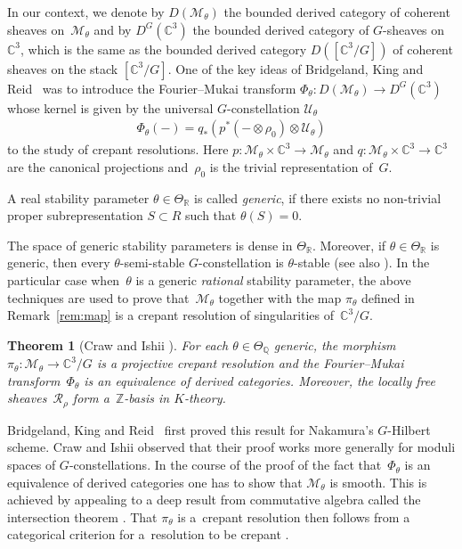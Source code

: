 \documentclass[pdftex]{sigma}
\numberwithin{equation}{section}
\newcommand{\sM}{\mathscr{M}}
\newcommand{\sR}{\mathscr{R}}
\newcommand{\sU}{\mathscr{U}}
\newcommand{\Z}{{\mathbb Z}}
\newcommand{\Q}{{\mathbb Q}}
\newcommand{\R}{{\mathbb R}}
\newcommand{\C}{{\mathbb C}}
\newtheorem{Theorem}{Theorem}[section]
\begin{document}
In our context, we denote by $D(\sM_\theta)$ the bounded derived
category of coherent sheaves on~$\sM_\theta$ and by $D^G(\C^3)$ the
bounded derived category of $G$-sheaves on $\C^3$, which is the same
as the bounded derived category $D([\C^3/G])$ of coherent sheaves on
the stack $[\C^3/G]$.  One of the key ideas of Bridgeland, King and
Reid~\cite{Bridgeland2001} was to introduce the Fourier--Mukai
transform $\Phi_\theta\colon D(\sM_\theta) \to D^G(\C^3)$ whose kernel is
given by the universal $G$-constellation $\sU_{\theta}$
\begin{gather*}%
  \Phi_\theta(-)=q_*(p^*(-\otimes\rho_0)\otimes\sU_\theta)
\end{gather*}
to the study of crepant resolutions.  Here $p\colon \sM_\theta\times
\C^3\to\sM_\theta$ and $q\colon \sM_\theta\times \C^3\to \C^3$ are the
canonical projections and~$\rho_0$ is the trivial representation of~$G$.

\begin{Definition}
  \label{Def_ThetaGeneric}
  A real stability parameter $\theta\in\Theta_\R$ is called
  \emph{generic}, if there exists no non-trivial proper
  subrepresentation $S\subset R$ such that $\theta(S)=0$.
\end{Definition}

The space of generic stability parameters is dense in
$\Theta_\R$. Moreover, if $\theta \in \Theta_{\R}$ is generic, then
every $\theta$-semi-stable $G$-constellation is $\theta$-stable
(see also \cite[Section~2.2]{Craw2004}). In the particular case when~$\theta$ is a generic {\em rational} stability parameter, the above
techniques are used to prove that~$\sM_{\theta}$ together with the map
$\pi_{\theta}$ def\/ined in Remark~\ref{rem:map} is a crepant resolution
of singularities of~$\C^3/G$.

\begin{Theorem}[Craw and Ishii ]\label{thm:bkr}
  For each $\theta \in \Theta_{\Q}$ generic, the morphism
  $\pi_{\theta}\colon \sM_\theta\to\C^3/G$ is a projective crepant
  resolution and the Fourier--Mukai transform~$\Phi_\theta$ is an
  equivalence of derived categories.  Moreover, the locally free
  sheaves~$\sR_{\rho}$ form a~$\Z$-basis in $K$-theory.
\end{Theorem}

\begin{Remark}
  Bridgeland, King and Reid~\cite{Bridgeland2001} f\/irst proved this
  result for Nakamura's $G$-Hilbert scheme.  Craw and Ishii observed
  that their proof works more generally for moduli spaces of
  $G$-constellations.  In the course of the proof of the fact that~$\Phi_\theta$ is an equivalence of derived categories one has to
  show that $\sM_\theta$ is smooth.  This is achieved by appealing to
  a deep result from commutative algebra called the intersection
  theorem \cite[Theorem~7.1]{Bridgeland2001}.  That $\pi_\theta$ is a~crepant resolution then follows from a categorical criterion for a~resolution to be crepant \cite[Lemma~3.1]{Bridgeland2001}.
\end{Remark}
\end{document}
